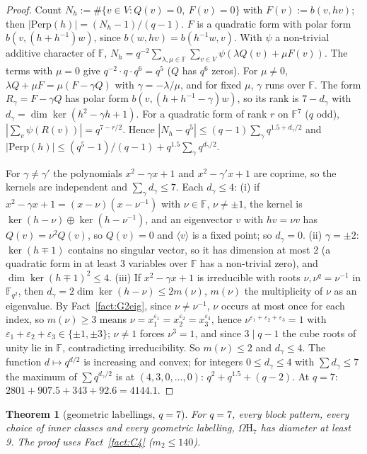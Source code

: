 \documentclass[11pt]{amsart}
\newtheorem{theorem}{Theorem}[section]
\theoremstyle{definition}
\theoremstyle{remark}
\numberwithin{equation}{section}
\newcommand{\F}{\mathbb F}
\newcommand{\eps}{\varepsilon}
\newcommand{\Om}{\Omega\mathrm H}
\begin{document}
\begin{proof}
Count $N_h:=\#\{v\in V:Q(v)=0,\ F(v)=0\}$ with $F(v):=b(v,hv)$; then $|\mathrm{Perp}(h)|=(N_h-1)/(q-1)$. $F$ is a quadratic
form with polar form $b(v,(h+h^{-1})w)$, since $b(w,hv)=b(h^{-1}w,v)$. With $\psi$ a non-trivial additive character of $\F$,
$N_h=q^{-2}\sum_{\lambda,\mu\in\F}\sum_{v\in V}\psi(\lambda Q(v)+\mu F(v))$. The terms with $\mu=0$ give $q^{-2}\cdot q\cdot q^6=q^5$
($Q$ has $q^6$ zeros). For $\mu\ne0$, $\lambda Q+\mu F=\mu(F-\gamma Q)$ with $\gamma=-\lambda/\mu$, and for fixed $\mu$, $\gamma$ runs
over $\F$. The form $R_\gamma=F-\gamma Q$ has polar form $b(v,(h+h^{-1}-\gamma)w)$, so its rank is $7-d_\gamma$ with
$d_\gamma=\dim\ker(h^2-\gamma h+1)$. For a quadratic form of rank $r$ on $\F^7$ ($q$ odd), $|\sum_v\psi(R(v))|=q^{7-r/2}$.
Hence $|N_h-q^5|\le(q-1)\sum_{\gamma}q^{1.5+d_\gamma/2}$ and $|\mathrm{Perp}(h)|\le(q^5-1)/(q-1)+q^{1.5}\sum_\gamma q^{d_\gamma/2}$.

For $\gamma\ne\gamma'$ the polynomials $x^2-\gamma x+1$ and $x^2-\gamma'x+1$ are coprime, so the kernels are independent and
$\sum_\gamma d_\gamma\le7$. Each $d_\gamma\le4$: (i) if $x^2-\gamma x+1=(x-\nu)(x-\nu^{-1})$ with $\nu\in\F$, $\nu\ne\pm1$, the kernel
is $\ker(h-\nu)\oplus\ker(h-\nu^{-1})$, and an eigenvector $v$ with $hv=\nu v$ has $Q(v)=\nu^2Q(v)$, so $Q(v)=0$ and
$\langle v\rangle$ is a fixed point; so $d_\gamma=0$. (ii) $\gamma=\pm2$: $\ker(h\mp1)$ contains no singular vector, so it has
dimension at most 2 (a quadratic form in at least 3 variables over $\F$ has a non-trivial zero), and $\dim\ker(h\mp1)^2\le4$.
(iii) If $x^2-\gamma x+1$ is irreducible with roots $\nu,\nu^q=\nu^{-1}$ in $\F_{q^2}$, then $d_\gamma=2\dim\ker(h-\nu)\le2m(\nu)$,
$m(\nu)$ the multiplicity of $\nu$ as an eigenvalue. By Fact~\ref{fact:G2eig}, since $\nu\ne\nu^{-1}$, $\nu$ occurs at most
once for each index, so $m(\nu)\ge3$ means $\nu=x_1^{\eps_1}=x_2^{\eps_2}=x_3^{\eps_3}$, hence $\nu^{\eps_1+\eps_2+\eps_3}=1$
with $\eps_1+\eps_2+\eps_3\in\{\pm1,\pm3\}$; $\nu\ne1$ forces $\nu^3=1$, and since $3\mid q-1$ the cube roots of unity lie in $\F$,
contradicting irreducibility. So $m(\nu)\le2$ and $d_\gamma\le4$. The function $d\mapsto q^{d/2}$ is increasing and convex; for
integers $0\le d_\gamma\le4$ with $\sum d_\gamma\le7$ the maximum of $\sum q^{d_\gamma/2}$ is at $(4,3,0,\dots,0)$:
$q^2+q^{1.5}+(q-2)$. At $q=7$: $2801+907.5+343+92.6=4144.1$.
\end{proof}

\begin{theorem}[geometric labellings, $q=7$]\label{thm:geomq7}
For $q=7$, every block pattern, every choice of inner classes and every geometric labelling, $\Om_7$ has diameter at least 9.
The proof uses Fact~\ref{fact:C4} ($m_2\le140$).
\end{theorem}
\end{document}
